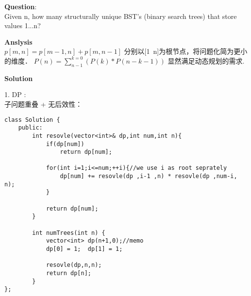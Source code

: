 \begin{description}
    \item{\textbf{Question}}:\\%
		Given n, how many structurally unique BST's (binary search trees) that store values 1...n?\\

    \item{\textbf{Anslysis}}\\
		$p[m,n]=p[m-1,n]+p[m,n-1]$
		分别以[1~n]为根节点，将问题化简为更小的维度．
		$P(n)=\sum_{n-1}^{k=0}(P(k)\ast P(n-k-1))$
		显然满足动态规划的需求.
		

    \item{\textbf{Solution}}\\
	\item{1. DP} : \\
		子问题重叠 + 无后效性：\\
    \begin{lstlisting}
class Solution {
	public:
		int resovle(vector<int>& dp,int num,int n){
			if(dp[num])
				return dp[num];

			for(int i=1;i<=num;++i){//we use i as root seprately
				dp[num] += resovle(dp ,i-1 ,n) * resovle(dp ,num-i, n); 
			}

			return dp[num];
		}

		int numTrees(int n) {
			vector<int> dp(n+1,0);//memo
			dp[0] = 1;	dp[1] = 1;

			resovle(dp,n,n);
			return dp[n];
		}
};
    \end{lstlisting}
\end{description}


